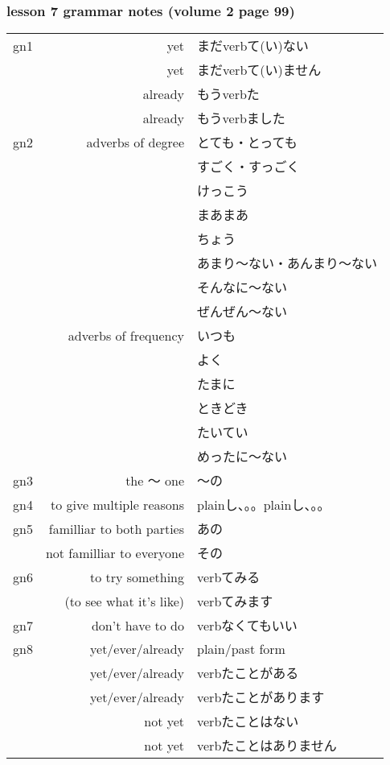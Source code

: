 \documentclass[14pt,onecolumn]{extarticle}
\begin{document}
\begin{CJK}{UTF8}{min}

\subsubsection{lesson 7 grammar notes (volume 2 page 99)}

\begin{tabular}{lrl}

gn1&yet&まだverbて(い)ない\\
&yet&まだverbて(い)ません\\
&already&もうverbた\\
&already&もうverbました\\
\hline

gn2&adverbs of degree&
  とても・とっても\\
&&すごく・すっごく\\
&&けっこう\\
&&まあまあ\\
&&ちょう\\
&&あまり〜ない・あんまり〜ない\\
&&そんなに〜ない\\
&&ぜんぜん〜ない\\
&adverbs of frequency&
  いつも\\
&&よく\\
&&たまに\\
&&ときどき\\
&&たいてい\\
&&めったに〜ない\\
\hline

gn3&the 〜 one&〜の\\
\hline

gn4&to give multiple reasons&plainし、。。plainし、。。\\
\hline

gn5&familliar to both parties&あの\\
&not familliar to everyone&その\\
\hline

gn6&to try something&
  verbてみる\\
&(to see what it's like)&
  verbてみます\\
\hline

gn7&don't have to do&verbなくてもいい\\
\hline

gn8&yet/ever/already&plain/past form\\
&yet/ever/already&verbたことがある\\
&yet/ever/already&verbたことがあります\\
&not yet&verbたことはない\\
&not yet&verbたことはありません\\
\hline


\end{tabular}
\end{CJK}
\end{document}
